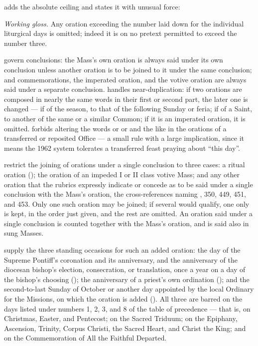  adds the absolute ceiling and states it with unusual force:

\begin{studyframe}
\medskip

\textit{Working gloss.} Any oration exceeding the number laid down for the individual liturgical
days is omitted; indeed it is on no pretext permitted to exceed the number three.
\end{studyframe}

 govern conclusions: the Mass's own oration is always said under its own
conclusion unless another oration is to be joined to it under the same conclusion; and
commemorations, the imperated oration, and the votive oration are always said under a separate
conclusion.  handles near-duplication: if two orations are composed in nearly the same
words in their first or second part, the later one is changed — if of the season, to that of the
following Sunday or feria; if of a Saint, to another of the same or a similar Common; if it is
an imperated oration, it is omitted.  forbids altering the words  or
 or  and the like in the orations of a transferred or
reposited Office — a small rule with a large implication, since it means the 1962 system
tolerates a transferred feast praying about ``this day''.

 restrict the joining of orations under a single conclusion to three cases: a
ritual oration (); the oration of an impeded I or II class votive Mass; and any other
oration that the rubrics expressly indicate or concede as to be said under a single conclusion
with the Mass's oration, the cross-references naming , 350, 449, 451, and 453. Only one
such oration may be joined; if several would qualify, one only is kept, in the order just given,
and the rest are omitted. An oration said under a single conclusion is counted together with the
Mass's oration, and is said also in sung Masses.

 supply the three standing occasions for such an added oration: the day of the
Supreme Pontiff's coronation and its anniversary, and the anniversary of the diocesan bishop's
election, consecration, or translation, once a year on a day of the bishop's choosing
(); the anniversary of a priest's own ordination (); and the second-to-last
Sunday of October or another day appointed by the local Ordinary for the Missions, on which the
oration  is added (). All three are barred on the days
listed under numbers 1, 2, 3, and 8 of the table of precedence — that is, on Christmas, Easter,
and Pentecost; on the Sacred Triduum; on the Epiphany, Ascension, Trinity, Corpus Christi, the
Sacred Heart, and Christ the King; and on the Commemoration of All the Faithful Departed.

